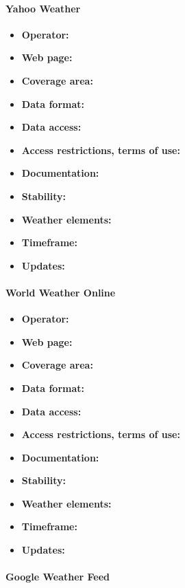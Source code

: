 \paragraph{Yahoo Weather}

\begin{itemize}
  \item \textbf{Operator:}
  \item \textbf{Web page:}
  \item \textbf{Coverage area:}
  \item \textbf{Data format:}
  \item \textbf{Data access:}
  \item \textbf{Access restrictions, terms of use:}
  \item \textbf{Documentation:}
  \item \textbf{Stability:}
  \item \textbf{Weather elements:}
  \item \textbf{Timeframe:}
  \item \textbf{Updates:}
\end{itemize}

\paragraph{World Weather Online}

\begin{itemize}
  \item \textbf{Operator:}
  \item \textbf{Web page:}
  \item \textbf{Coverage area:}
  \item \textbf{Data format:}
  \item \textbf{Data access:}
  \item \textbf{Access restrictions, terms of use:}
  \item \textbf{Documentation:}
  \item \textbf{Stability:}
  \item \textbf{Weather elements:}
  \item \textbf{Timeframe:}
  \item \textbf{Updates:}
\end{itemize}

\paragraph{Google Weather Feed}

